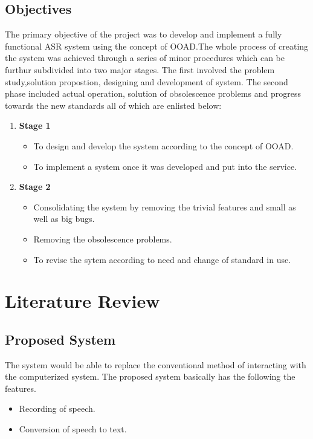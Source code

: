 \documentclass[a4paper,12pt,onepage]{article}
\begin{document}
\subsection{Objectives}
The primary objective of the project was to develop and implement a fully functional ASR system using the concept of OOAD.The whole process of creating the system was achieved through a series of minor procedures which can be furthur subdivided into two major stages. The first involved the problem study,solution propostion, designing and development of system. The second phase included actual operation, solution of obsolescence problems and progress towards the new standards all of which are enlisted below:
\\
\begin{enumerate}
	\item \textbf{Stage 1}
	\begin{itemize}
	\item To design and develop the system according to the concept of OOAD.
	\item To implement a system once it was developed and put into the service.
	\end{itemize}
\item \textbf{Stage 2}
	\begin{itemize}
	\item Consolidating the system by removing the trivial features and small as well as big bugs.
	\item Removing the obsolescence problems.
	\item To revise the sytem according to need and change of standard in use.
	\end{itemize}
\end{enumerate}
\newpage
\section{Literature Review} 
	\subsection{Proposed System}
	The system would be able to replace the conventional method of interacting with the computerized system. The proposed system basically has the following the features.\\
	\begin{itemize}
	\item Recording of speech.
	\item Conversion of speech to text.
	\end{itemize}
	\newpage
	
\end{document}
